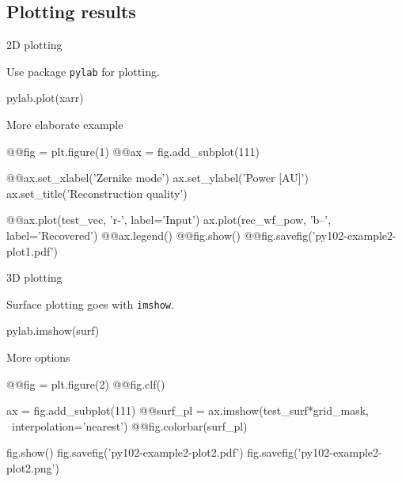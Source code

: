 \documentclass[xetex,10pt]{beamer}
\def\pythoni{\lstinline[language=pythontim]}
\def\spacer{\vspace*{1em}}
\begin{document}
\subsection{Plotting results}

\begin{frame}[fragile]{2D plotting}

Use package \pythoni{pylab} for plotting.

\begin{python}
pylab.plot(xarr)
\end{python}

\spacer
\pause
More elaborate example

\begin{pythonln}[firstnumber=131]
@@fig = plt.figure(1)
@@ax = fig.add_subplot(111)

@@ax.set_xlabel('Zernike mode')
ax.set_ylabel('Power [AU]')
ax.set_title('Reconstruction quality')

@@ax.plot(test_vec, 'r-', label='Input')
ax.plot(rec_wf_pow, 'b--', label='Recovered')
@@ax.legend()
@@fig.show()
@@fig.savefig('py102-example2-plot1.pdf')
\end{pythonln}

\end{frame}

\begin{frame}[fragile]{3D plotting}

Surface plotting goes with \pythoni{imshow}.

\begin{python}
pylab.imshow(surf)
\end{python}

\spacer
\pause
More options

\begin{pythonln}[firstnumber=144]
@@fig = plt.figure(2)
@@fig.clf()

ax = fig.add_subplot(111)
@@surf_pl = ax.imshow(test_surf*grid_mask, \
  interpolation='nearest')
@@fig.colorbar(surf_pl)

fig.show()
fig.savefig('py102-example2-plot2.pdf')
fig.savefig('py102-example2-plot2.png')
\end{pythonln}

\end{frame}
\end{document}
